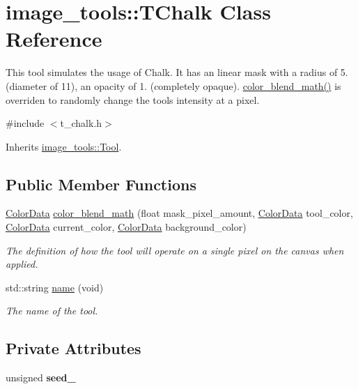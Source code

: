\hypertarget{classimage__tools_1_1TChalk}{}\section{image\+\_\+tools\+:\+:T\+Chalk Class Reference}
\label{classimage__tools_1_1TChalk}


This tool simulates the usage of Chalk. It has an linear mask with a radius of 5. (diameter of 11), an opacity of 1. (completely opaque). \hyperlink{classimage__tools_1_1TChalk_a3cda7adc97a776c6575452f9d983eff5}{color\+\_\+blend\+\_\+math()} is overriden to randomly change the tool\textquotesingle{}s intensity at a pixel.  




{\ttfamily \#include $<$t\+\_\+chalk.\+h$>$}



Inherits \hyperlink{classimage__tools_1_1Tool}{image\+\_\+tools\+::\+Tool}.

\subsection*{Public Member Functions}
\begin{DoxyCompactItemize}
\item 
\hyperlink{classimage__tools_1_1ColorData}{Color\+Data} \hyperlink{classimage__tools_1_1TChalk_a3cda7adc97a776c6575452f9d983eff5}{color\+\_\+blend\+\_\+math} (float mask\+\_\+pixel\+\_\+amount, \hyperlink{classimage__tools_1_1ColorData}{Color\+Data} tool\+\_\+color, \hyperlink{classimage__tools_1_1ColorData}{Color\+Data} current\+\_\+color, \hyperlink{classimage__tools_1_1ColorData}{Color\+Data} background\+\_\+color)
\begin{DoxyCompactList}\small\item\em The definition of how the tool will operate on a single pixel on the canvas when applied. \end{DoxyCompactList}\item 
std\+::string \hyperlink{classimage__tools_1_1TChalk_a74f65065dbc618e5f30089597d39bb46}{name} (void)
\begin{DoxyCompactList}\small\item\em The name of the tool. \end{DoxyCompactList}\end{DoxyCompactItemize}
\subsection*{Private Attributes}
\begin{DoxyCompactItemize}
\item 
unsigned {\bfseries seed\+\_\+}\hypertarget{classimage__tools_1_1TChalk_a918945c12f8ff800a5c78b16951055d0}{}\label{classimage__tools_1_1TChalk_a918945c12f8ff800a5c78b16951055d0}

\end{DoxyCompactItemize}

